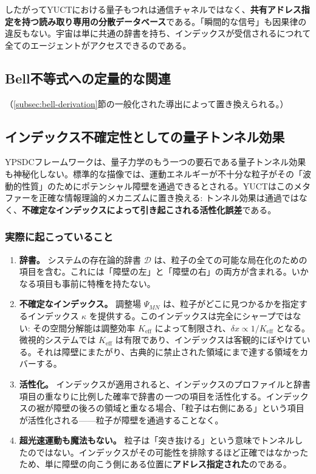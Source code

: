 \documentclass[12pt,a4paper]{article}
\theoremstyle{definition}
\theoremstyle{remark}
\begin{document}
	したがってYUCTにおける量子もつれは通信チャネルではなく、\textbf{共有アドレス指定を持つ読み取り専用の分散データベース}である。「瞬間的な信号」も因果律の違反もない。宇宙は単に共通の辞書を持ち、インデックスが受信されるにつれて全てのエージェントがアクセスできるのである。
	
	\subsection{Bell不等式への定量的な関連}
	\label{subsec:bell-inequalities}
	
	（\ref{subsec:bell-derivation}節の一般化された導出によって置き換えられる。）
	
	\subsection{インデックス不確定性としての量子トンネル効果}
	
	YPSDCフレームワークは、量子力学のもう一つの要石である量子トンネル効果も神秘化しない。標準的な描像では、運動エネルギーが不十分な粒子がその「波動的性質」のためにポテンシャル障壁を通過できるとされる。YUCTはこのメタファーを正確な情報理論的メカニズムに置き換える: トンネル効果は通過ではなく、\textbf{不確定なインデックスによって引き起こされる活性化誤差}である。
	
	\subsubsection{実際に起こっていること}
	
	\begin{enumerate}[leftmargin=*]
		\item \textbf{辞書。}
		システムの存在論的辞書 $\mathcal{D}$ は、粒子の全ての可能な局在化のための項目を含む。これには「障壁の左」と「障壁の右」の両方が含まれる。いかなる項目も事前に特権を持たない。
		
		\item \textbf{不確定なインデックス。}
		調整場 $\Psi_{MN}$ は、粒子がどこに見つかるかを指定するインデックス $\kappa$ を提供する。このインデックスは完全にシャープではない: その空間分解能は調整効率 $K_{\mathrm{eff}}$ によって制限され、$\delta x \propto 1/K_{\mathrm{eff}}$ となる。微視的システムでは $K_{\mathrm{eff}}$ は有限であり、インデックスは客観的にぼやけている。それは障壁にまたがり、古典的に禁止された領域にまで達する領域をカバーする。
		
		\item \textbf{活性化。}
		インデックスが適用されると、インデックスのプロファイルと辞書項目の重なりに比例した確率で辞書の\emph{一つ}の項目を活性化する。インデックスの裾が障壁の後ろの領域と重なる場合、「粒子は右側にある」という項目が活性化される——粒子が障壁を通過することなく。
		
		\item \textbf{超光速運動も魔法もない。}
		粒子は「突き抜ける」という意味でトンネルしたのではない。インデックスがその可能性を排除するほど正確ではなかったため、単に障壁の向こう側にある位置に\textbf{アドレス指定された}のである。
	\end{enumerate}
	
\end{document}
